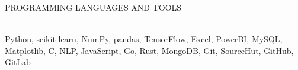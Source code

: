 \documentclass{resume} %
\begin{document}
\begin{rSection}{PROGRAMMING LANGUAGES AND TOOLS}

\\Python, scikit-learn, NumPy, pandas, TensorFlow, Excel, PowerBI, MySQL, Matplotlib, C, NLP, JavaScript, Go, Rust, MongoDB, Git, SourceHut, GitHub, GitLab\\\\
\end{rSection}
\end{document}
